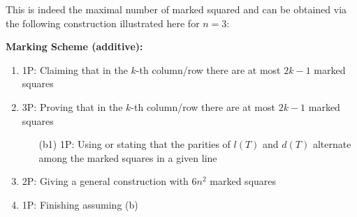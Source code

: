 {\newpage

This is indeed the maximal number of marked squared and can be obtained via the following construction illustrated here for $n = 3$:

\bigskip

\renewcommand{\mark}{$\bigstar$}

\begin{center}
\end{center}

\bigskip

\textbf{Marking Scheme (additive):}

\begin{enumerate}
\item 1P: Claiming that in the $k$-th column/row there are at most $2k-1$ marked squares
\item 3P: Proving that in the $k$-th column/row there are at most $2k-1$ marked squares
\begin{enumerate}
\item[(b1)] 1P: Using or stating that the parities of $l(T)$ and $d(T)$ alternate among the marked squares in a given line
\end{enumerate}
\item 2P: Giving a general construction with $6n^2$ marked squares
\item 1P: Finishing assuming (b)
\end{enumerate}
}
